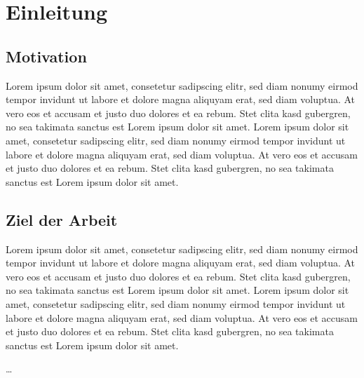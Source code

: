 \graphicspath{{Einleitung/img/}}
\chapter{Einleitung}\label{sec:einleitung}

\section{Motivation}\label{sec:motivation}

Lorem ipsum dolor sit amet, consetetur sadipscing elitr, sed diam nonumy eirmod
tempor invidunt ut labore et dolore magna aliquyam erat, sed diam voluptua. At
vero eos et accusam et justo duo dolores et ea rebum. Stet clita kasd
gubergren, no sea takimata sanctus est Lorem ipsum dolor sit amet. Lorem ipsum
dolor sit amet, consetetur sadipscing elitr, sed diam nonumy eirmod tempor
invidunt ut labore et dolore magna aliquyam erat, sed diam voluptua. At vero
eos et accusam et justo duo dolores et ea rebum. Stet clita kasd gubergren, no
sea takimata sanctus est Lorem ipsum dolor sit amet.


\section{Ziel der Arbeit}\label{sec:ziel_der_arbeit}

Lorem ipsum dolor sit amet, consetetur sadipscing elitr, sed diam nonumy eirmod
tempor invidunt ut labore et dolore magna aliquyam erat, sed diam voluptua. At
vero eos et accusam et justo duo dolores et ea rebum. Stet clita kasd
gubergren, no sea takimata sanctus est Lorem ipsum dolor sit amet. Lorem ipsum
dolor sit amet, consetetur sadipscing elitr, sed diam nonumy eirmod tempor
invidunt ut labore et dolore magna aliquyam erat, sed diam voluptua. At vero
eos et accusam et justo duo dolores et ea rebum. Stet clita kasd gubergren, no
sea takimata sanctus est Lorem ipsum dolor sit amet.

\ldots


